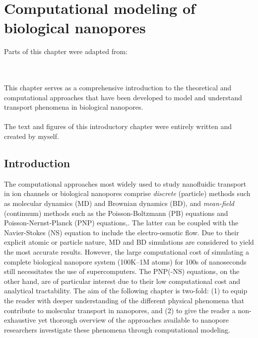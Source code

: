 \chapter{Computational modeling of biological nanopores}\label{ch:modelling}

\begin{shaded}
Parts of this chapter were adapted from:\\
\\
\\
\newpage
\end{shaded}

This chapter serves as a comprehensive introduction to the theoretical and computational approaches that have been developed to model and understand transport phenomena in biological nanopores. \\
\\
The text and figures of this introductory chapter were entirely written and created by myself.

\newpage

\section{Introduction}

The computational approaches most widely used to study nanofluidic transport in ion channels or biological
nanopores comprise \emph{discrete} (particle) methods such as molecular dynamics
(MD)\cite{Lynden-Bell-1996,Allen-1999,Aksimentiev-2005,Luan-2008,Bhattacharya-2011,Zhang-2014,DiMarino-2015,Belkin-2016}
and Brownian dynamics
(BD),\cite{Schirmer-1999,Im-2002,Noskov-2004,Millar-2008,Egwolf-2010,DeBiase-2015,Pederson-2015} and
\emph{mean-field} (continuum) methods such as the Poisson-Boltzmann (PB)
equations\cite{Grochowski-2008,Baldessari-2008-1} and Poisson-Nernst-Planck (PNP)
equations,\cite{Eisenberg-1996,Gillespie-2002,Simakov-2010}. The latter can be coupled with the Navier-Stokes
(NS) equation to include the electro-osmotic flow.\cite{Lu-2012,Pederson-2015} Due to their explicit atomic or
particle nature, MD and BD simulations are considered to yield the most accurate results. However, the large
computational cost of simulating a complete biological nanopore system (100K--1M atoms) for 100s of
nanoseconds still necessitates the use of supercomputers.\cite{Aksimentiev-2005,Bhattacharya-2011} The
PNP(-NS) equations, on the other hand, are of particular interest due to their low computational cost and
analytical tractability. The aim of the following chapter is two-fold: (1) to equip the reader with deeper
understanding of the different physical phenomena that contribute to molecular transport in nanopores, and
(2) to give the reader a non-exhaustive yet thorough overview of the approaches available to nanopore
researchers investigate these phenomena through computational modeling.

